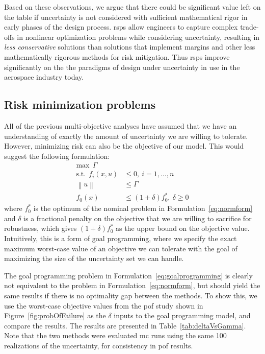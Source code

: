 Based on these observations, we argue that there could be significant value left on the table
if uncertainty is not considered with sufficient mathematical rigor in early phases of
the design process. \gls{rsp}s allow engineers to capture complex
trade-offs in nonlinear optimization problems while considering uncertainty,
resulting in \emph{less conservative} solutions
than solutions that implement margins and other less mathematically
rigorous methods for risk mitigation. Thus \gls{rsp}s improve significantly on the
the paradigms of design under uncertainty in use in the aerospace industry today.

\subsection{Risk minimization problems}

All of the previous multi-objective analyses have assumed that we have an
understanding of exactly the amount of uncertainty we are
willing to tolerate. However, minimizing risk can also be the objective of our
model. This would suggest the following formulation:
\begin{equation}
    \begin{split}
    \text{max}~~\Gamma \\
    \text{s.t.}~~f_i(x,u) &\leq 0,~i = 1,\ldots,n \\
                    \left\lVert u \right\rVert &\leq \Gamma \\
                    f_0(x) &\leq (1+\delta)f_0^*,~\delta \geq 0
    \end{split}
    \label{eq:goalprogramming}
\end{equation}
where $f_0^*$ is the optimum of the nominal problem in Formulation~\ref{eq:normform} and $\delta$
is a fractional penalty on the objective that we are willing to sacrifice for robustness, which
gives $(1+\delta)f_0^*$ as the upper bound on the objective value. Intuitively,
this is a form of goal programming,
where we specify the exact maximum worst-case value of an objective we can tolerate with
the goal of maximizing the size of the uncertainty set we can handle.

The goal programming problem in Formulation~\ref{eq:goalprogramming} is clearly
not equivalent to the problem in Formulation~\ref{eq:normform},
but should yield the same results if there is no
optimality gap between the methods.
To show this, we use the worst-case objective values from the \gls{pof} study
shown in Figure~\ref{fig:probOfFailure} as the $\delta$ inputs to the goal programming model, and compare the results.
The results are presented in
Table~\ref{tab:deltaVsGamma}. Note that the two methods were evaluated \gls{mc} runs using the same 100 realizations
of the uncertainty, for consistency in \gls{pof} results.

